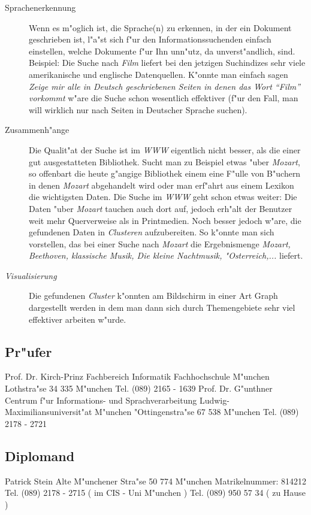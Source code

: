 \begin{description}

	\item[Sprachenerkennung] Wenn es m"oglich ist, die Sprache(n) zu erkennen, in der ein Dokument geschrieben ist, l"a"st sich f"ur den Informationssuchenden einfach einstellen, welche Dokumente f"ur Ihn unn"utz, da unverst"andlich, sind.\nl
	Beispiel: Die Suche nach {\it Film} liefert bei den jetzigen Suchindizes sehr viele amerikanische und englische Datenquellen. K"onnte man einfach sagen {\it Zeige mir alle in Deutsch geschriebenen Seiten in denen das Wort {\it "`Film"'} vorkommt} w"are die Suche schon wesentlich effektiver (f"ur den Fall, man will wirklich nur nach Seiten in Deutscher Sprache suchen).

	\item[Zusammenh"ange] Die Qualit"at der Suche ist im {\it WWW} eigentlich nicht besser, als die einer gut ausgestatteten Bibliothek. Sucht man zu Beispiel etwas "uber {\it Mozart}, so offenbart die heute g"angige Bibliothek einem eine F"ulle von B"uchern in denen {\it Mozart} abgehandelt wird oder man erf"ahrt aus einem Lexikon die wichtigsten Daten.\nl
	 Die Suche im {\it WWW} geht schon etwas weiter: Die Daten "uber {\it Mozart} tauchen auch dort auf, jedoch erh"alt der Benutzer weit mehr Querverweise als in Printmedien.\nl
	 Noch besser jedoch w"are, die gefundenen Daten in {\it Clusteren} aufzubereiten. So k"onnte man sich vorstellen, das bei einer Suche nach {\it Mozart} die Ergebnismenge {\it Mozart, Beethoven, klassische Musik, Die kleine Nachtmusik, "Osterreich,...} liefert.

	\item[{\it Visualisierung}] Die gefundenen {\it Cluster} k"onnten am Bildschirm in einer Art Graph dargestellt werden in dem man dann sich durch Themengebiete sehr viel effektiver arbeiten w"urde.
\end{description}

\subsection{Pr"ufer}
Prof. Dr. Kirch-Prinz		\nl
Fachbereich Informatik		\nl
Fachhochschule M"unchen		\nl
Lothstra"se 34				 335 M"unchen				\nl
Tel. (089) 2165 - 1639		\nl
\nl
Prof. Dr. G"unthner			\nl
Centrum f"ur Informations- und Sprachverarbeitung	\nl
Ludwig-Maximiliansuniversit"at M"unchen	\nl
"Ottingenstra"se 67			 538 M"unchen				\nl
Tel. (089) 2178 - 2721		\nl

\subsection{Diplomand}
Patrick Stein	\nl
Alte M"unchener Stra"se 50	 774 M"unchen	\nl
Matrikelnummer: 814212	\nl
Tel. (089) 2178 - 2715 ( im CIS - Uni M"unchen )	\nl
Tel. (089) 950 57 34 ( zu Hause )	\nl









